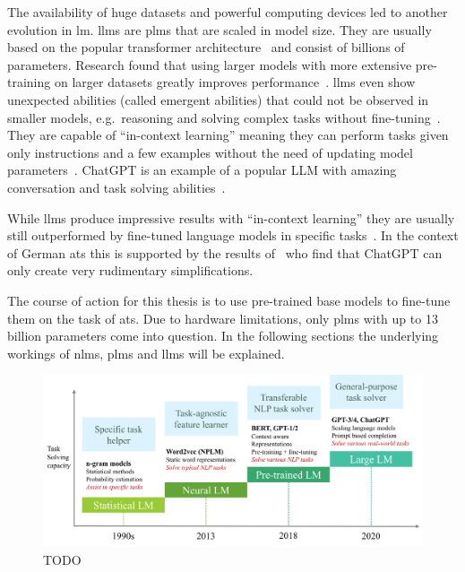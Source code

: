 The availability of huge datasets and powerful computing devices led to another evolution in \gls{lm}.
\glspl{llm} are \glspl{plm} that are scaled in model size.
They are usually based on the popular transformer architecture~\autocite{Hadi_2023} and consist of billions of parameters.
Research found that using larger models with more extensive pre-training on larger datasets greatly improves performance~\autocite{Raiaan2024ARO}.
\glspl{llm} even show unexpected abilities (called emergent abilities) that could not be observed in smaller models, e.g.\ reasoning and solving complex tasks without fine-tuning~\autocite{zhao2023survey}.
They are capable of \enquote{in-context learning} meaning they can perform tasks given only instructions and a few examples without the need of updating model parameters~\autocite{bhatia2023tart}.
ChatGPT is an example of a popular \gls{LLM} with amazing conversation and task solving abilities~\autocite{zhao2023survey}.

While \glspl{llm} produce impressive results with \enquote{in-context learning} they are usually still outperformed by fine-tuned language models in specific tasks~\autocite{bhatia2023tart}.
In the context of German \gls{ats} this is supported by the results of~\textcite{deilen2023using} who find that ChatGPT can only create very rudimentary simplifications.

The course of action for this thesis is to use pre-trained base models to fine-tune them on the task of \gls{ats}.
Due to hardware limitations, only \glspl{plm} with up to 13 billion parameters come into question.
In the following sections the underlying workings of \glspl{nlm}, \glspl{plm} and \glspl{llm} will be explained.

\begin{figure}
    \centering
    \includegraphics[width=\linewidth]{images/languagemodels}
    \caption[TODO.]{TODO~\autocite{zhao2023survey}}
    \label{fig:language-models}
\end{figure}

